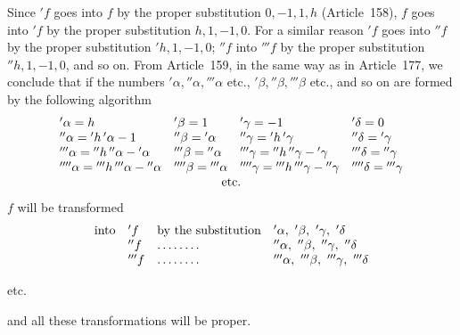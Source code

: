 Since ${}'f$ goes into $f$ by the proper substitution $0,-1,1,h$ (Article~158), $f$ goes into ${}'f$ by the proper substitution $h,1,-1,0$. For a similar reason ${}'f$ goes into ${}''f$ by the proper substitution ${}'h,1,-1,0$; ${}''f$ into ${}'''f$ by the proper substitution ${}''h,1,-1,0$, and so on. From Article~159, in the same way as in Article~177, we conclude that if the numbers ${}'\alpha,{}''\alpha,{}'''\alpha$ etc., ${}'\beta,{}''\beta,{}'''\beta$ etc., and so on are formed by the following algorithm
{\small
\setlength{\arraycolsep}{3pt}
\[
\begin{array}{llll}
{}'\alpha=h&{}'\beta=1&{}'\gamma=-1&{}'\delta=0\\
{}''\alpha={}'h\,{}'\alpha-1&{}''\beta={}'\alpha&{}''\gamma={}'h\,{}'\gamma&{}''\delta={}'\gamma\\
{}'''\alpha={}''h\,{}''\alpha-{}'\alpha&{}'''\beta={}''\alpha&{}'''\gamma={}''h\,{}''\gamma-{}'\gamma&{}'''\delta={}''\gamma\\
{}''''\alpha={}'''h\,{}'''\alpha-{}''\alpha&{}''''\beta={}'''\alpha&{}''''\gamma={}'''h\,{}'''\gamma-{}''\gamma&{}''''\delta={}'''\gamma
\\
\multicolumn{4}{c}{\text{etc.}}
\end{array}
\]
}
$f$ will be transformed
\[
\begin{array}{@{}rlll@{}}
\text{into}&{}'f&\text{by the substitution}&{}'\alpha,\ {}'\beta,\ {}'\gamma,\ {}'\delta\\
&{}''f&\mathinner{\ldotp\ldotp\ldotp\ldotp\ldotp\ldotp\ldotp\ldotp}&{}''\alpha,\ {}''\beta,\ {}''\gamma,\ {}''\delta\\
&{}'''f&\mathinner{\ldotp\ldotp\ldotp\ldotp\ldotp\ldotp\ldotp\ldotp}&{}'''\alpha,\ {}'''\beta,\ {}'''\gamma,\ {}'''\delta
\end{array}
\]
\centerline{etc.}
and all these transformations will be proper.

